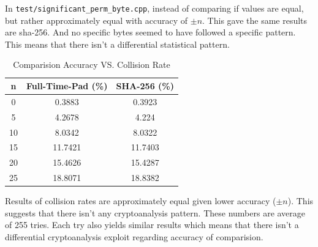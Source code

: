 \documentclass[fleqn, a4paper,12pt]{article}
\begin{document}
In \texttt{test/significant\_perm\_byte.cpp}, instead of comparing if values are equal, but rather approximately equal with accuracy of $\pm n$. This gave the same results are sha-256. And no specific bytes seemed to have followed a specific pattern. This means that there isn't a differential statistical pattern.

\begin{table}[h!]
\centering
\begin{tabular}{|c|c|c|}
\hline
\textbf{n} & \textbf{Full-Time-Pad (\%)} & \textbf{SHA-256 (\%)} \\
\hline
		0 & 0.3883 & 0.3923 \\
\hline
		5 & 4.2678 & 4.224 \\
\hline
		10 & 8.0342 & 8.0322 \\
\hline
		15 & 11.7421 & 11.7403 \\
\hline
		20 & 15.4626 & 15.4287 \\
\hline
		25 & 18.8071 & 18.8382 \\
\hline
\end{tabular}
\caption{Comparision Accuracy VS. Collision Rate}
\end{table}

Results of collision rates are approximately equal given lower accuracy ($\pm n$). This suggests that there isn't any cryptoanalysis pattern. These numbers are average of 255 tries. Each try also yields similar results which means that there isn't a differential cryptoanalysis exploit regarding accuracy of comparision.
\end{document}
